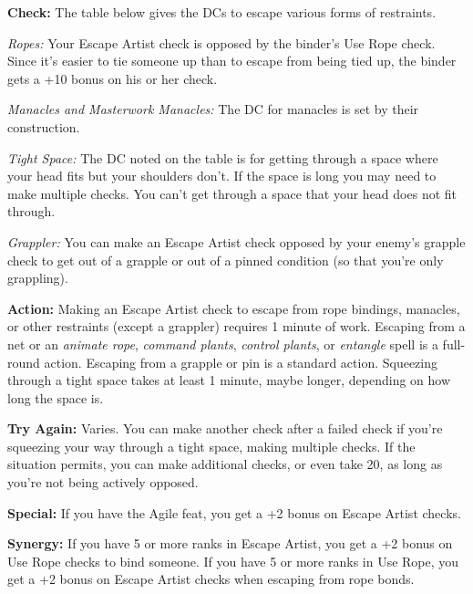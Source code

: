 \textbf{Check:} The table below gives the DCs to escape various forms of restraints.

\textit{Ropes:} Your Escape Artist check is opposed by the binder’s Use Rope check. Since it’s easier to tie someone up than to escape from being tied up, the binder gets a +10 bonus on his or her check.

\textit{Manacles and Masterwork Manacles:} The DC for manacles is set by their construction.

\textit{Tight Space:} The DC noted on the table is for getting through a space where your head fits but your shoulders don’t. If the space is long you may need to make multiple checks. You can’t get through a space that your head does not fit through.

\textit{Grappler:} You can make an Escape Artist check opposed by your enemy’s grapple check to get out of a grapple or out of a pinned condition (so that you’re only grappling).


\textbf{Action:} Making an Escape Artist check to escape from rope bindings, manacles, or other restraints (except a grappler) requires 1 minute of work. Escaping from a net or an \emph{animate rope}, \emph{command plants}, \emph{control plants}, or \emph{entangle} spell is a full-round action. Escaping from a grapple or pin is a standard action. Squeezing through a tight space takes at least 1 minute, maybe longer, depending on how long the space is.

\textbf{Try Again:} Varies. You can make another check after a failed check if you’re squeezing your way through a tight space, making multiple checks. If the situation permits, you can make additional checks, or even take 20, as long as you’re not being actively opposed.

\textbf{Special:} If you have the Agile feat, you get a +2 bonus on Escape Artist checks.

\textbf{Synergy:} If you have 5 or more ranks in Escape Artist, you get a +2 bonus on Use Rope checks to bind someone.
If you have 5 or more ranks in Use Rope, you get a +2 bonus on Escape Artist checks when escaping from rope bonds.